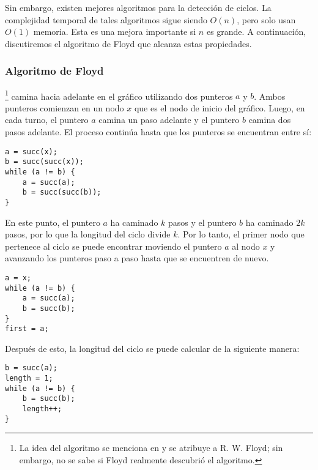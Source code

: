 Sin embargo, existen mejores algoritmos para la detección de ciclos.
La complejidad temporal de tales algoritmos sigue siendo $O(n)$,
pero solo usan $O(1)$ memoria.
Esta es una mejora importante si $n$ es grande.
A continuación, discutiremos el algoritmo de Floyd que
alcanza estas propiedades.

\subsubsection{Algoritmo de Floyd}


\footnote{La idea del algoritmo se menciona en \cite{knu982}
y se atribuye a R. W. Floyd; sin embargo, no se sabe si Floyd realmente
descubrió el algoritmo.} camina hacia adelante
en el gráfico utilizando dos punteros $a$ y $b$.
Ambos punteros comienzan en un nodo $x$ que
es el nodo de inicio del gráfico.
Luego, en cada turno, el puntero $a$ camina
un paso adelante y el puntero $b$
camina dos pasos adelante.
El proceso continúa hasta
que los punteros se encuentran entre sí:
\begin{lstlisting}
a = succ(x);
b = succ(succ(x));
while (a != b) {
    a = succ(a);
    b = succ(succ(b));
}
\end{lstlisting}


En este punto, el puntero $a$ ha caminado $k$ pasos
y el puntero $b$ ha caminado $2k$ pasos,
por lo que la longitud del ciclo divide $k$.
Por lo tanto, el primer nodo que pertenece al ciclo
se puede encontrar moviendo el puntero $a$ al nodo $x$
y avanzando los punteros
paso a paso hasta que se encuentren de nuevo.
\begin{lstlisting}
a = x;
while (a != b) {
    a = succ(a);
    b = succ(b);
}
first = a;
\end{lstlisting}

Después de esto, la longitud del ciclo
se puede calcular de la siguiente manera:
\begin{lstlisting}
b = succ(a);
length = 1;
while (a != b) {
    b = succ(b);
    length++;
}
\end{lstlisting}
